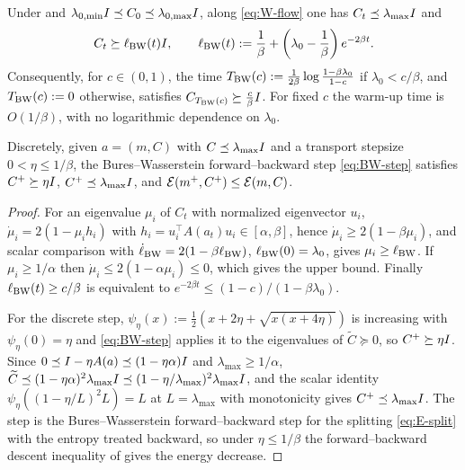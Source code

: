 \begin{lemma}\label{lem:cov-BW}
    Under  and
    $\lambda_{0,\min}I\preceq C_0\preceq\lambda_{0,\max}I$, along \eqref{eq:W-flow} one has
    $C_t\preceq\lambda_{\max}I$ and
    \begin{equation*}
        C_t\succeq\ell_{\mathrm{BW}}(t)I,
        \qquad
        \ell_{\mathrm{BW}}(t):=\frac1\beta+\left(\lambda_0-\frac1\beta\right)e^{-2\beta t}.
    \end{equation*}
    Consequently, for $c\in(0,1)$, the time
    $T_{\mathrm{BW}}(c):=\tfrac1{2\beta}\log\tfrac{1-\beta\lambda_0}{1-c}$ if $\lambda_0<c/\beta$, and
    $T_{\mathrm{BW}}(c):=0$ otherwise, satisfies $C_{T_{\mathrm{BW}}(c)}\succeq\tfrac c\beta I$. For fixed
    $c$ the warm-up time is $O(1/\beta)$, with no logarithmic dependence on $\lambda_0$.

    Discretely, given $a=(m,C)$ with $C\preceq\lambda_{\max}I$ and a transport stepsize
    $0<\eta\leq1/\beta$, the Bures--Wasserstein forward--backward step \eqref{eq:BW-step}
    satisfies $C^+\succeq\eta I$, $C^+\preceq\lambda_{\max}I$, and
    $\mathcal{E}(m^+,C^+)\leq\mathcal{E}(m,C)$.
\end{lemma}

\begin{proof}
    For an eigenvalue $\mu_i$ of $C_t$ with normalized eigenvector $u_i$,
    $\dot\mu_i=2(1-\mu_ih_i)$ with $h_i=u_i^\top A(a_t)u_i\in[\alpha,\beta]$, hence
    $\dot\mu_i\geq2(1-\beta\mu_i)$, and scalar comparison with
    $\dot\ell_{\mathrm{BW}}=2(1-\beta\ell_{\mathrm{BW}})$, $\ell_{\mathrm{BW}}(0)=\lambda_0$, gives
    $\mu_i\geq\ell_{\mathrm{BW}}$. If $\mu_i\geq1/\alpha$ then $\dot\mu_i\leq2(1-\alpha\mu_i)\leq0$,
    which gives the upper bound. Finally $\ell_{\mathrm{BW}}(t)\geq c/\beta$ is equivalent to
    $e^{-2\beta t}\leq(1-c)/(1-\beta\lambda_0)$.

    For the discrete step, $\psi_\eta(x):=\tfrac12(x+2\eta+\sqrt{x(x+4\eta)})$ is increasing
    with $\psi_\eta(0)=\eta$ and \eqref{eq:BW-step} applies it to the eigenvalues of
    $\widetilde C\succeq0$, so $C^+\succeq\eta I$. Since
    $0\preceq I-\eta A(a)\preceq(1-\eta\alpha)I$ and $\lambda_{\max}\geq1/\alpha$,
    $\widetilde C\preceq(1-\eta\alpha)^2\lambda_{\max}I
    \preceq(1-\eta/\lambda_{\max})^2\lambda_{\max}I$, and the scalar identity
    $\psi_\eta((1-\eta/L)^2L)=L$ at $L=\lambda_{\max}$ with monotonicity gives
    $C^+\preceq\lambda_{\max}I$. The step is the Bures--Wasserstein forward--backward step
    for the splitting \eqref{eq:E-split} with the entropy treated backward, so under
    $\eta\leq1/\beta$ the forward--backward descent inequality of \citet{diao2023forward}
    gives the energy decrease.
\end{proof}

